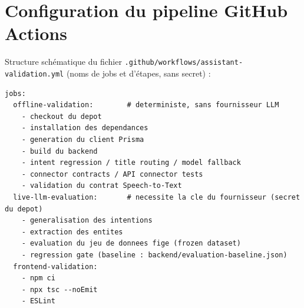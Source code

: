 \documentclass[11pt,a4paper,openany,oneside]{report}
\begin{document}
\chapter{Configuration du pipeline GitHub Actions}\label{ann:ci}
Structure schématique du fichier \texttt{.github/workflows/assistant-validation.yml} (noms de jobs et d'étapes, sans secret) :
\begin{lstlisting}
jobs:
  offline-validation:        # deterministe, sans fournisseur LLM
    - checkout du depot
    - installation des dependances
    - generation du client Prisma
    - build du backend
    - intent regression / title routing / model fallback
    - connector contracts / API connector tests
    - validation du contrat Speech-to-Text
  live-llm-evaluation:       # necessite la cle du fournisseur (secret du depot)
    - generalisation des intentions
    - extraction des entites
    - evaluation du jeu de donnees fige (frozen dataset)
    - regression gate (baseline : backend/evaluation-baseline.json)
  frontend-validation:
    - npm ci
    - npx tsc --noEmit
    - ESLint
\end{lstlisting}
\end{document}
